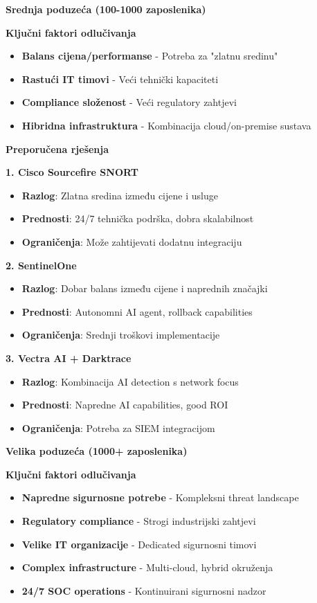 \textbf{Srednja poduzeća (100-1000 zaposlenika)}

\textbf{Ključni faktori odlučivanja}
\begin{itemize}
\item \textbf{Balans cijena/performanse} - Potreba za "zlatnu sredinu"
\item \textbf{Rastući IT timovi} - Veći tehnički kapaciteti
\item \textbf{Compliance složenost} - Veći regulatory zahtjevi
\item \textbf{Hibridna infrastruktura} - Kombinacija cloud/on-premise sustava
\end{itemize}

\textbf{Preporučena rješenja}

\textbf{1. Cisco Sourcefire SNORT}
\begin{itemize}
\item \textbf{Razlog}: Zlatna sredina između cijene i usluge
\item \textbf{Prednosti}: 24/7 tehnička podrška, dobra skalabilnost
\item \textbf{Ograničenja}: Može zahtijevati dodatnu integraciju
\end{itemize}

\textbf{2. SentinelOne}
\begin{itemize}
\item \textbf{Razlog}: Dobar balans između cijene i naprednih značajki
\item \textbf{Prednosti}: Autonomni AI agent, rollback capabilities
\item \textbf{Ograničenja}: Srednji troškovi implementacije
\end{itemize}

\textbf{3. Vectra AI + Darktrace}
\begin{itemize}
\item \textbf{Razlog}: Kombinacija AI detection s network focus
\item \textbf{Prednosti}: Napredne AI capabilities, good ROI
\item \textbf{Ograničenja}: Potreba za SIEM integracijom
\end{itemize}

\textbf{Velika poduzeća (1000+ zaposlenika)}

\textbf{Ključni faktori odlučivanja}
\begin{itemize}
\item \textbf{Napredne sigurnosne potrebe} - Kompleksni threat landscape
\item \textbf{Regulatory compliance} - Strogi industrijski zahtjevi
\item \textbf{Velike IT organizacije} - Dedicated sigurnosni timovi
\item \textbf{Complex infrastructure} - Multi-cloud, hybrid okruženja
\item \textbf{24/7 SOC operations} - Kontinuirani sigurnosni nadzor
\end{itemize}

